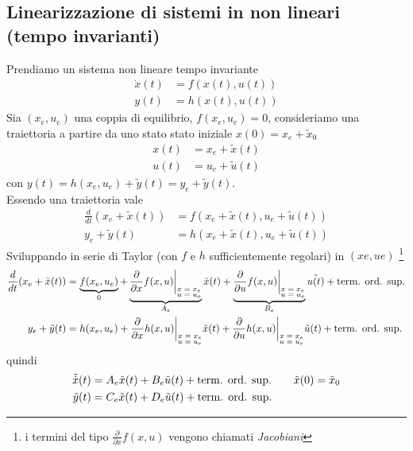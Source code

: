 \documentclass{article}
\begin{document}
\subsection{Linearizzazione di sistemi in non lineari (tempo invarianti)}
Prendiamo un  sistema non lineare tempo invariante
\begin{align*}
    \dot x(t) &= f (x(t), u(t))\\
    y(t) &= h(x(t), u(t))
\end{align*}
Sia $(x_e,u_e)$ una coppia di equilibrio, $f(x_e,u_e)=0$, consideriamo una traiettoria a partire da uno stato stato iniziale $x(0)=x_e+ \tilde{x}_0$ 
\begin{align*}
    x(t) &= x_e + \tilde{x}(t)\\
    u(t) &= u_e + \tilde{u}(t)
\end{align*}
con $y(t) = h(x_e , u_e ) + \tilde{y}(t) = y_e + \tilde{y}(t)$.\\
Essendo una traiettoria vale
\begin{align*}
    \frac{d}{dt}(x_e + \tilde{x}(t)) &= f (x_e + \tilde{x}(t), u_e + \tilde{u}(t))\\
    y_e + \tilde{y}(t) &= h(x_e+\tilde{x}(t), u_e+ \tilde{u}(t))
\end{align*}
Sviluppando in serie di Taylor (con $f$ e $h$ sufficientemente regolari) in $(xe , ue )$ \footnote[1]{i termini del tipo $\frac{\partial}{\partial x}f(x,u)$ vengono chiamati \textit{Jacobiani}}
\begin{align*}
    \frac{d}{dt}(x_e + \tilde{x}(t)) &= \underbrace{f(x_e,u_e)}_{0} + \underbrace{\frac{\partial}{\partial x}f(x,u)\bigg|_{\substack{\text{$x=x_e$} \\ \text{$u=u_e$}}}}_{A_e} \tilde{x}(t) + \underbrace{\frac{\partial}{\partial u}f(x,u)\bigg|_{\substack{\text{$x=x_e$} \\ \text{$u=u_e$}}}}_{B_e} \tilde{u(t)} + \text{term. ord. sup.}\\
    y_e+\tilde{y}(t) &= h(x_e,u_e) + \frac{\partial}{\partial x}h(x,u) \bigg|_{\substack{\text{$x=x_e$} \\ \text{$u=u_e$}}} \tilde{x}(t) + \frac{\partial}{\partial u}h(x,u) \bigg|_{\substack{\text{$x=x_e$} \\ \text{$u=u_e$}}} \tilde{u}(t) + \text{term. ord. sup.}
\end{align*} 
quindi
\begin{align*}
    \tilde{\dot x}(t) &= A_e \tilde{x}(t) + B_e \tilde{u}(t) + \T{term. ord. sup.} \tag*{$\tilde{x}(0) = \tilde{x}_0$}\\
    \tilde{y}(t) &= C_e \tilde{x}(t) + D_e\tilde{u}(t) + \T{term. ord. sup.}
\end{align*}
\end{document}
